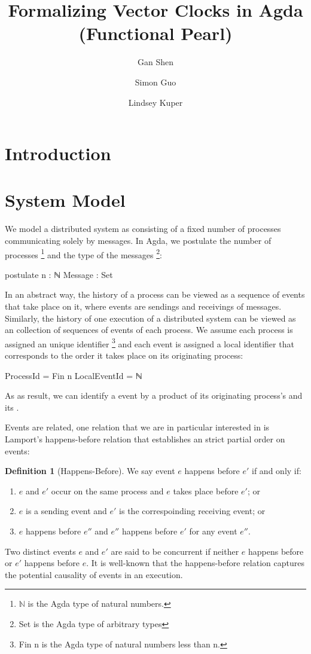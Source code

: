 \documentclass[acmsmall,review,anonymous]{acmart}
\title{Formalizing Vector Clocks in Agda (Functional Pearl)}
\author{Gan Shen}
\affiliation{\institution{University of California, Santa Cruz} \country{USA}}
\author{Simon Guo}
\affiliation{\institution{University of California, Santa Cruz} \country{USA}}
\author{Lindsey Kuper}
\affiliation{\institution{University of California, Santa Cruz} \country{USA}}
\theoremstyle{definition}
\newtheorem{definition}{Definition}
\theoremstyle{theorem}
\begin{document}
\maketitle

\section{Introduction}

\section{System Model}
We model a distributed system as consisting of a fixed number of
processes communicating solely by messages. In Agda, we postulate the
number of processes \footnote{\ensuremath{\mathbb{N}} is
the Agda type of natural numbers.} and the type of the messages
\footnote{Set is the Agda type of arbitrary types}:
\begin{code}
postulate
  n : ℕ
  Message : Set
\end{code}
In an abstract way, the history of a process can be viewed as a
sequence of events that take place on it, where events are sendings
and receivings of messages. Similarly, the history of one execution of
a distributed system can be viewed as an collection of sequences of
events of each process. We assume each process is assigned an unique
identifier \footnote{Fin n is the Agda type of
natural numbers less than n.} and each event is assigned a local
identifier  that corresponds to the order it
takes place on its originating process:
\begin{code}
ProcessId = Fin n
LocalEventId = ℕ
\end{code}
\noindent As as result, we can identify
a event by a product of its originating process's 
and its .

Events are related, one relation that we are in particular interested
in is Lamport's happens-before relation that establishes an strict
partial order on events:
\begin{definition}[Happens-Before]
  We say event $e$ happens before $e'$ if and only if:
  \begin{enumerate}
  \item $e$ and $e'$ occur on the same process and $e$ takes place before $e'$; or
  \item $e$ is a sending event and $e'$ is the correspoinding receiving event; or
  \item $e$ happens before $e''$ and $e''$ happens before $e'$ for any event $e''$.
  \end{enumerate}
\end{definition}
\noindent Two distinct events $e$ and $e'$ are said to be concurrent
if neither $e$ happens before or $e'$ happens before $e$.  It is
well-known that the happens-before relation captures the potential
causality of events in an execution.
\end{document}
